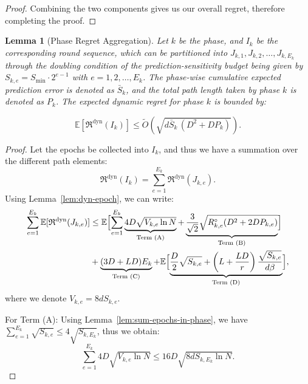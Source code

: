 \documentclass[journal,onecolumn]{IEEEtran}
\theoremstyle{plain}
\newtheorem{lemma}[theorem]{Lemma}
\theoremstyle{definition}
\theoremstyle{remark}
\newcommand{\regret}{\mathfrak{R}}
\begin{document}
{\begin{proof}
Combining the two components gives us our overall regret, therefore completing the proof.
\end{proof}

\begin{lemma}[Phase Regret Aggregation]
\label{lem:dyn-phase}
Let $k$ be the phase, and $I_k$ be the corresponding round sequence, which can be partitioned into $J_{k,1}, J_{k,2}, \dots , J_{k,E_k}$ through the doubling condition of the prediction-sensitivity budget being given by $S_{k,e}=S_{\min}\cdot2^{e-1}$ with $e=1,2,\dotsc,E_k$. The phase-wise cumulative expected prediction error is denoted as $\bar S_k$, and the total path length taken by phase $k$ is denoted as $P_k$. The expected dynamic regret for phase $k$ is bounded by:

\begin{equation*}
\mathbb{E}\left[\regret^{\mathrm{dyn}}(I_k)\right]
\le\widetilde{O}\!\left(\sqrt{d\bar S_k\,(D^2 + D P_k)}\right).
\end{equation*}
\end{lemma}

\begin{proof}
Let the epochs be collected into $I_k$, and thus we have a summation over the different path elements:
\begin{equation*}
\regret^{\mathrm{dyn}}(I_k) = \sum_{e=1}^{E_k} \regret^{\mathrm{dyn}}(J_{k,e}).
\end{equation*}
Using Lemma~\ref{lem:dyn-epoch}, we can write:
\begin{align*}
\sum_{e=1}^{E_k} \mathbb{E}[\regret^{\mathrm{dyn}}(J_{k,e})] 
&\le \mathbb{E}\Bigl[\sum_{e=1}^{E_k}  \underbrace{4 D \sqrt{V_{k,e} \ln N}}_{\text{Term (A)}} + \underbrace{\frac{3}{\sqrt{2}}\sqrt{R_{k,e}^{\circ} (D^2 + 2D P_{k,e})}}_{\text{Term (B)}}\Bigr] \\&+ \underbrace{(3D+LD)E_k}_{\text{Term (C)}}+ \mathbb{E}\Bigl[\underbrace{\frac{D}{2}\sqrt{S_{k,e}}+\left(L+\frac{LD}{r}\right)\frac{\sqrt{S_{k,e}}}{d\beta}}_{\text{Term (D)}}
\Bigr],
\end{align*}
where we denote $V_{k,e} = 8d S_{k,e}$.

For Term (A): Using Lemma~\ref{lem:sum-epochs-in-phase}, we have $\sum_{e=1}^{E_k}\sqrt{S_{k,e}}\leq 4\sqrt{S_{k,E_k}}$, thus we obtain:
\begin{equation*}
    \sum_{e=1}^{E_k} 4 D \sqrt{V_{k,e} \ln N}\le 16 D \sqrt{8d S_{k,E_k} \ln N}.
\end{equation*}


\end{proof}}
\end{document}
